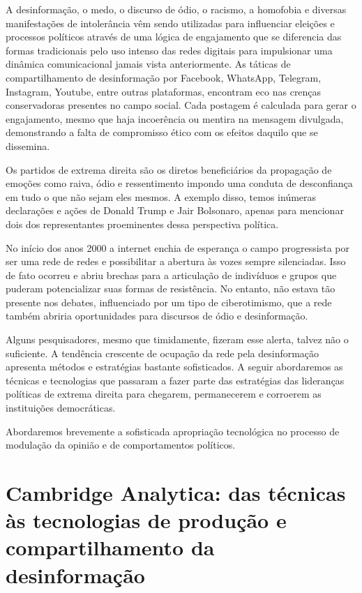 A desinformação, o medo, o discurso de ódio, o racismo, a homofobia e
diversas manifestações de intolerância vêm sendo utilizadas para
influenciar eleições e processos políticos através de uma lógica de
engajamento que se diferencia das formas tradicionais pelo uso intenso
das redes digitais para impulsionar uma dinâmica comunicacional jamais
vista anteriormente. As táticas de compartilhamento de desinformação por
Facebook, WhatsApp, Telegram, Instagram, Youtube, entre outras
plataformas, encontram eco nas crenças conservadoras presentes no campo
social. Cada postagem é calculada para gerar o engajamento, mesmo que
haja incoerência ou mentira na mensagem divulgada, demonstrando a falta
de compromisso ético com os efeitos daquilo que se dissemina.

Os partidos de extrema direita são os diretos beneficiários da
propagação de emoções como raiva, ódio e ressentimento impondo uma
conduta de desconfiança em tudo o que não sejam eles mesmos. A exemplo
disso, temos inúmeras declarações e ações de Donald Trump e Jair
Bolsonaro, apenas para mencionar dois dos representantes proeminentes
dessa perspectiva política.

No início dos anos 2000 a internet enchia de esperança o campo
progressista por ser uma rede de redes e possibilitar a abertura às
vozes sempre silenciadas. Isso de fato ocorreu e abriu brechas para a
articulação de indivíduos e grupos que puderam potencializar suas formas
de resistência. No entanto, não estava tão presente nos debates,
influenciado por um tipo de ciberotimismo, que a rede também abriria
oportunidades para discursos de ódio e desinformação.

Alguns pesquisadores, mesmo que timidamente, fizeram esse alerta, talvez
não o suficiente. A tendência crescente de ocupação da rede pela
desinformação apresenta métodos e estratégias bastante sofisticados. A
seguir abordaremos as técnicas e tecnologias que passaram a fazer parte
das estratégias das lideranças políticas de extrema direita para
chegarem, permanecerem e corroerem as instituições democráticas.

Abordaremos brevemente a sofisticada apropriação tecnológica no processo
de modulação da opinião e de comportamentos políticos.

\section{Cambridge Analytica: das técnicas às tecnologias de produção e
compartilhamento da desinformação }

